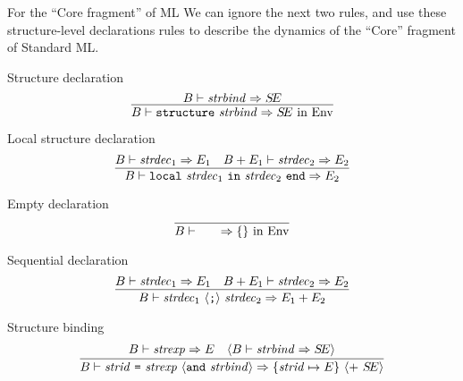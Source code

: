 \begin{remark}{For the ``Core fragment'' of ML}
We can ignore the next two rules, and use these structure-level
declarations rules to describe the dynamics of the ``Core'' fragment of
Standard ML.
\end{remark}

\begin{inference-rule}{Structure declaration}
\begin{equation}\label{rule:dynamic-modules:structure-declaration}
\vcenter{\infer{\B\ts\singstrdec\ra\SE\ \In\ \Env}
  {\B\ts\strbind\ra\SE}}
\end{equation}
\end{inference-rule}

\begin{inference-rule}{Local structure declaration}
\begin{equation}\label{rule:dynamic-modules:local-structure-declaration}
\vcenter{\infer{\B\ts\localstrdec\ra\E_{2}}
  {\B\ts\strdec_{1}\ra\E_{1}
    & \B+\E_{1}\ts\strdec_{2}\ra\E_{2}}}
\end{equation}
\end{inference-rule}

\begin{inference-rule}{Empty declaration}
\begin{equation}\label{rule:dynamic-modules:empty-declaration}
\vcenter{\infer{\B\ts\emptystrdec\ra \emptymap{\rm\ in}\ \Env}
  {}}
\end{equation}
\end{inference-rule}

\begin{inference-rule}{Sequential declaration}
\begin{equation}\label{rule:dynamic-modules:sequential-declaration}
\vcenter{\infer{\B\ts\seqstrdec\ra\plusmap{\E_{1}}{\E_{2}}}
  {\B\ts\strdec_{1}\ra\E_{1}
    & \B+\E_{1}\ts\strdec_{2}\ra\E_{2}}}
\end{equation}
\end{inference-rule}


\begin{inference-rule}{Structure binding}
\begin{equation}\label{rule:dynamic-modules:structure-binding}
\vcenter{\infer{\B\ts\barestrbindera\ra\{\strid\mapsto\E\}
                \ \optional{ +\ \SE}}
  {\B\ts\strexp\ra\E
    & \optional{\B\ts\strbind\ra\SE}}}
\end{equation}
\end{inference-rule}

